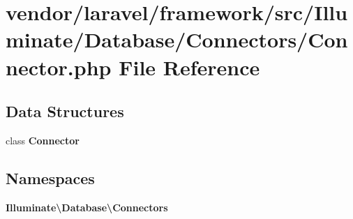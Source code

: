\section{vendor/laravel/framework/src/\+Illuminate/\+Database/\+Connectors/\+Connector.php File Reference}
\label{_connector_8php}
\subsection*{Data Structures}
\begin{DoxyCompactItemize}
\item 
class {\bf Connector}
\end{DoxyCompactItemize}
\subsection*{Namespaces}
\begin{DoxyCompactItemize}
\item 
 {\bf Illuminate\textbackslash{}\+Database\textbackslash{}\+Connectors}
\end{DoxyCompactItemize}
